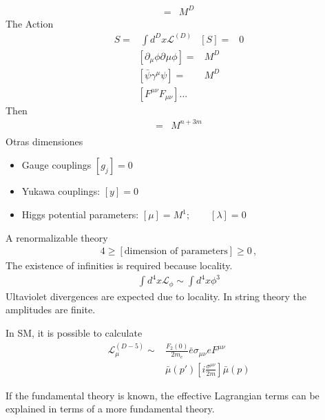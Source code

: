 \documentclass[12pt,letterpaper]{article}
\begin{document}
\begin{align*}
  [\mathcal{L^{(D)}}]=&M^D
\end{align*}
The Action
\begin{align*}
  S=&\int d^Dx \mathcal{L}^{(D)} & [S]=&0
\end{align*}
\begin{align*}
  \left[ \partial_{\mu}\phi \partial^{}{\mu}\phi\right]=&M^D\\
\left[ \bar{\psi} \gamma^{\mu}\psi\right]=& M^D\\
\left[ F^{\mu\nu} F_{\mu\nu}\right]...
\end{align*}
Then
\begin{align*}
  [\phi^n(\bar{\psi }\psi)^m]=&M^{n+3m}\\
\end{align*}
Otras dimensiones
\begin{itemize}
\item Gauge couplings $[g_j]=0$
\item Yukawa couplings: $[y]=0$
\item Higgs potential parameters: $[\mu]=M^1;\qquad [\lambda]=0$
\end{itemize}
A renormalizable theory
\begin{align*}
  4\ge [\text{dimension of parameters}]\ge 0\,,
\end{align*}
The existence of infinities is required because locality.
\begin{align*}
  \int d^4x\mathcal{L}_{\phi}\sim \int d^4 x\phi^{3}
\end{align*}
Ultaviolet divergences are expected due to locality. In string theory the amplitudes are finite. 

In SM, it is possible to calculate
\begin{align*}
  \mathcal{L}^{(D-5)}_{\mu}\sim&\frac{F_2(0)}{2m_e}\bar{e}\sigma_{\mu\nu}e F^{\mu\nu}\\
&\bar{\mu}(p')\left[ i\frac{\sigma^{\mu\nu}}{2m} \right]\bar{\mu}(p)
\end{align*}


If the fundamental theory is known, the effective Lagrangian terms can be explained in terms of a more fundamental theory. 
\end{document}
